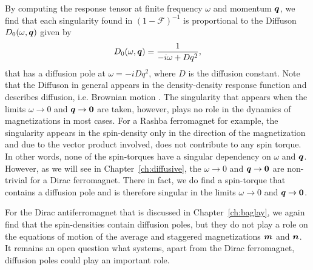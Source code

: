 By computing the response tensor at finite frequency $\omega$ and momentum $\boldsymbol{q}$, we find that each singularity found in $(1-\mathcal{F})^{-1}$ is proportional to the Diffuson $D_0(\omega,\boldsymbol{q})$ given by
\begin{equation}
    D_0(\omega,\boldsymbol{q}) = \frac{1}{-i\omega+D q^2},
\end{equation}
that has a diffusion pole at $\omega = -i D q^2$, where $D$ is the diffusion constant. Note that the Diffuson in general appears in the density-density response function and describes diffusion, i.e. Brownian motion \cite{rammer_quantum_1986}. The singularity that appears when the limits $\omega\rightarrow0$ and $\boldsymbol{q}\rightarrow\boldsymbol{0}$ are taken, however, plays no role in the dynamics of magnetizations in most cases. For a Rashba ferromagnet \cite{ado_microscopic_2017} for example, the singularity appears in the spin-density only in the direction of the magnetization and due to the vector product involved, does not contribute to any spin torque. In other words, none of the spin-torques have a singular dependency on $\omega$ and $\boldsymbol{q}$. However, as we will see in Chapter~\ref{ch:diffusive}, the $\omega\rightarrow0$ and $\boldsymbol{q}\rightarrow\boldsymbol{0}$ are non-trivial for a Dirac ferromagnet. There in fact, we do find a spin-torque that contains a diffusion pole and is therefore singular in the limits $\omega\rightarrow0$ and $\boldsymbol{q}\rightarrow\boldsymbol{0}$.

For the Dirac antiferromagnet that is discussed in Chapter~\ref{ch:baglay}, we again find that the spin-densities contain diffusion poles, but they do not play a role on the equations of motion of the average and staggered magnetizations $\boldsymbol{m}$ and $\boldsymbol{n}$. It remains an open question what systems, apart from the Dirac ferromagnet, diffusion poles could play an important role. 
